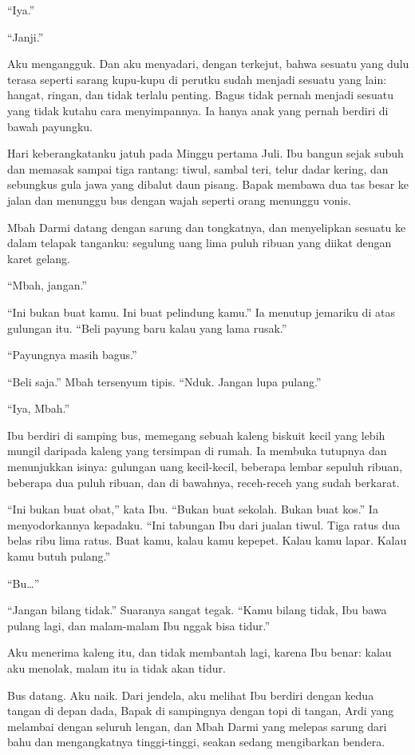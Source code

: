 \documentclass[11pt,twoside,openany]{book}
\makeatletter
\newcommand{\scenebreak}{\par\vspace{0.9em}{\centering\textsc{*\hspace{0.7em}*\hspace{0.7em}*}\par}\vspace{0.9em}\@afterindentfalse\@afterheading}
\makeatother
\begin{document}
``Iya.''

``Janji.''

Aku mengangguk. Dan aku menyadari, dengan terkejut, bahwa sesuatu yang dulu terasa seperti sarang kupu-kupu di perutku sudah menjadi sesuatu yang lain: hangat, ringan, dan tidak terlalu penting. Bagus tidak pernah menjadi sesuatu yang tidak kutahu cara menyimpannya. Ia hanya anak yang pernah berdiri di bawah payungku.

\scenebreak
Hari keberangkatanku jatuh pada Minggu pertama Juli. Ibu bangun sejak subuh dan memasak sampai tiga rantang: tiwul, sambal teri, telur dadar kering, dan sebungkus gula jawa yang dibalut daun pisang. Bapak membawa dua tas besar ke jalan dan menunggu bus dengan wajah seperti orang menunggu vonis.

Mbah Darmi datang dengan sarung dan tongkatnya, dan menyelipkan sesuatu ke dalam telapak tanganku: segulung uang lima puluh ribuan yang diikat dengan karet gelang.

``Mbah, jangan.''

``Ini bukan buat kamu. Ini buat pelindung kamu.'' Ia menutup jemariku di atas gulungan itu. ``Beli payung baru kalau yang lama rusak.''

``Payungnya masih bagus.''

``Beli saja.'' Mbah tersenyum tipis. ``Nduk. Jangan lupa pulang.''

``Iya, Mbah.''

Ibu berdiri di samping bus, memegang sebuah kaleng biskuit kecil yang lebih mungil daripada kaleng yang tersimpan di rumah. Ia membuka tutupnya dan menunjukkan isinya: gulungan uang kecil-kecil, beberapa lembar sepuluh ribuan, beberapa dua puluh ribuan, dan di bawahnya, receh-receh yang sudah berkarat.

``Ini bukan buat obat,'' kata Ibu. ``Bukan buat sekolah. Bukan buat kos.'' Ia menyodorkannya kepadaku. ``Ini tabungan Ibu dari jualan tiwul. Tiga ratus dua belas ribu lima ratus. Buat kamu, kalau kamu kepepet. Kalau kamu lapar. Kalau kamu butuh pulang.''

``Bu\ldots{}''

``Jangan bilang tidak.'' Suaranya sangat tegak. ``Kamu bilang tidak, Ibu bawa pulang lagi, dan malam-malam Ibu nggak bisa tidur.''

Aku menerima kaleng itu, dan tidak membantah lagi, karena Ibu benar: kalau aku menolak, malam itu ia tidak akan tidur.

Bus datang. Aku naik. Dari jendela, aku melihat Ibu berdiri dengan kedua tangan di depan dada, Bapak di sampingnya dengan topi di tangan, Ardi yang melambai dengan seluruh lengan, dan Mbah Darmi yang melepas sarung dari bahu dan mengangkatnya tinggi-tinggi, seakan sedang mengibarkan bendera.
\end{document}
